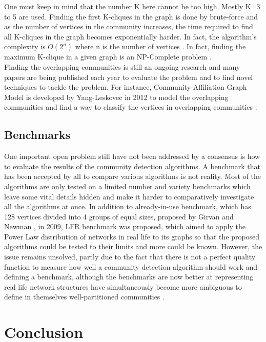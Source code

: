 \documentclass[10pt]{article}
\begin{document}
One must keep in mind that the number K here cannot be too high. Mostly K=3 to 5 are used. Finding the first K-cliques in the graph is done by brute-force and as the number of vertices in the community increases, the time required to find all K-cliques in the graph becomes exponentially harder. In fact, the algorithm’s complexity is $O \left( 2^{n}\right)$ where n is the number of vertices \cite{eleven}. In fact, finding the maximum K-clique in a given graph is an NP-Complete problem \cite{clique}. \\

Finding the overlapping communities is still an ongoing research and many papers are being published each year to evaluate the problem and to find novel techniques to tackle the problem. For instance, Community-Affiliation Graph Model is developed by Yang-Leskovec in 2012 to model the overlapping communities and find a way to classify the vertices in overlapping communities \cite{overlapping}. \\

\subsection{Benchmarks}
One important open problem still have not been addressed by a consensus is how to evaluate the results of the community detection algorithms. A benchmark that has been accepted by all to compare various algorithms is not reality\cite{fortunato}. Most of the algorithms are only tested on a limited number and variety benchmarks which leave some vital details hidden and make it harder to comparatively investigate all the algorithms at once. In addition to already-in-use benchmark, which has 128 vertices divided into 4 groups of equal sizes, proposed by Girvan and Newman \cite{raghavan}, in 2009, LFR benchmark was proposed, which aimed to apply the Power Law distribution of networks in real life to its graphs so that the proposed algorithms could be tested to their limits and more could be known\cite{cdbible}. However, the issue remains unsolved, partly due to the fact that there is not a perfect quality function to measure how well a community detection algorithm should work and defining a benchmark, although the benchmarks are now better at representing real life network structures have simultaneously become more ambiguous to define in themselves well-partitioned communities \cite{fortunato}. \\

\section{Conclusion}
\end{document}
